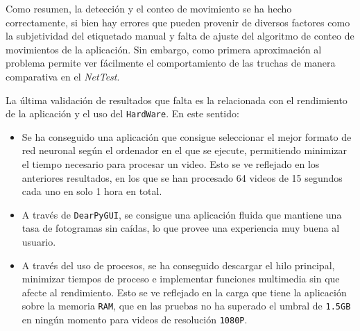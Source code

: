 Como resumen, la detección y el conteo de movimiento se ha hecho correctamente, si bien hay errores que pueden provenir de diversos factores como la subjetividad del etiquetado manual y falta de ajuste del algoritmo de conteo 
de movimientos de la aplicación. Sin embargo, como primera aproximación al problema permite ver fácilmente el comportamiento de las truchas de manera comparativa en el \textit{NetTest}.

\clearpage

La última validación de resultados que falta es la relacionada con el rendimiento de la aplicación y el uso del \texttt{HardWare}. En este sentido:

\begin{itemize}
    \item Se ha conseguido una aplicación que consigue seleccionar el mejor formato de red neuronal según el ordenador en el que se ejecute, permitiendo minimizar el tiempo necesario para procesar un video. Esto se ve reflejado en 
    los anteriores resultados, en los que se han procesado 64 videos de 15 segundos cada uno en solo 1 hora en total.
    \item A través de \texttt{DearPyGUI}, se consigue una aplicación fluida que mantiene una tasa de fotogramas sin caídas, lo que provee una experiencia muy buena al usuario.
    \item A través del uso de procesos, se ha conseguido descargar el hilo principal, minimizar tiempos de proceso e implementar funciones multimedia sin que afecte al rendimiento. Esto se ve reflejado en la carga que tiene la 
    aplicación sobre la memoria \texttt{RAM}, que en las pruebas no ha superado el umbral de \texttt{1.5GB} en ningún momento para videos de resolución \texttt{1080P}.
\end{itemize}
